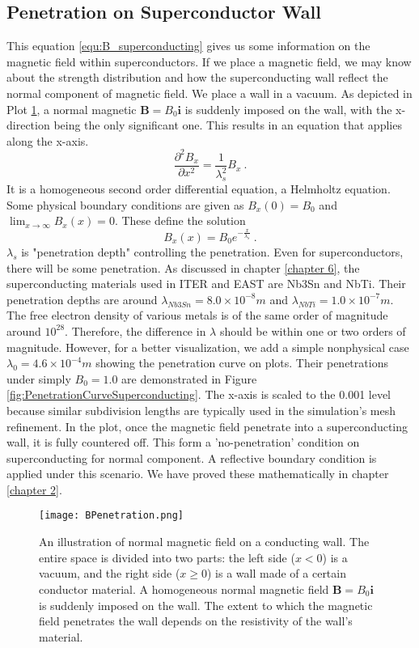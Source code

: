 \subsection{Penetration on Superconductor Wall}
This equation \ref{equ:B_superconducting} gives us some information on the magnetic field within superconductors. If we place a magnetic field, we may know about the strength distribution and how the superconducting wall reflect the normal component of magnetic field. We place a wall in a vacuum. As depicted in Plot \ref{fig:magneticPenetration}, a normal magnetic $\mathbf{B}=B_0\mathbf{i}$ is suddenly imposed on the wall, with the x-direction being the only significant one. This results in an equation that applies along the x-axis.
\begin{equation}
	\frac{\partial^2 B_x}{\partial x^2}=\frac{1}{\lambda_s^2}B_x\ .
\end{equation}
It is a homogeneous second order differential equation, a Helmholtz equation. Some physical boundary conditions are given as $B_x(0)=B_0$ and $\lim_{x \to \infty} B_x(x)=0$. These define the solution
\begin{equation*}
	B_x(x)=B_0e^{-\frac{x}{\lambda_s}}\ .
\end{equation*}
$\lambda_s$ is "penetration depth" controlling the penetration. Even for superconductors, there will be some penetration. As discussed in chapter \ref{chapter 6}, the superconducting materials used in ITER and EAST are Nb3Sn and NbTi. Their penetration depths are around $\lambda_{Nb3Sn}=8.0\times10^{-8}m$ and $\lambda_{NbTi}=1.0\times10^{-7}m$. The free electron density of various metals is of the same order of magnitude around $10^{28}$. Therefore, the difference in $\lambda$ should be within one or two orders of magnitude. However, for a better visualization, we add a simple nonphysical case    $\lambda_{0}=4.6\times10^{-4}m$ showing the penetration curve on plots. Their penetrations under simply $B_0=1.0$ are demonstrated in Figure \ref{fig:PenetrationCurveSuperconducting}. The x-axis is scaled to the 0.001 level because similar subdivision lengths are typically used in the simulation's mesh refinement. In the plot, once the magnetic field penetrate into a superconducting wall, it is fully countered off. This form a 'no-penetration' condition on superconducting for normal component. A reflective boundary condition is applied under this scenario. We have proved these mathematically in chapter \ref{chapter 2}. 
 
\begin{figure}[H]
	\centering
	\texttt{[image: BPenetration.png]}
	\caption[Magnetic Penetration]{An illustration of normal magnetic field on a conducting wall. The entire space is divided into two parts: the left side ($x<0$) is a vacuum, and the right side ($x\geq0$) is a wall made of a certain conductor material. A homogeneous normal magnetic field $\mathbf{B}=B_0\mathbf{i}$ is suddenly imposed on the wall. The extent to which the magnetic field penetrates the wall depends on the resistivity of the wall's material.}
	\label{fig:magneticPenetration}
\end{figure}

